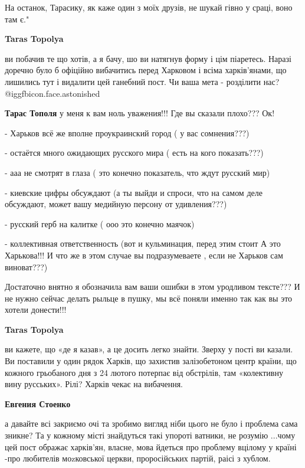 \begin{itemize}
\begin{itemize}
На останок, Тарасику, як каже один з моїх друзів, не шукай гівно у сраці, воно
там є."

\textbf{Taras Topolya} 

ви побачив те що хотів, а я бачу, шо ви натягнув форму і цім піаретесь. Наразі
доречно було б офіційно вибачитись перед Харковом і всіма харків'янами, що
лишились тут і видалити цей ганебний пост. Чи ваша мета - розділити нас?  @igg{fbicon.face.astonished} 

\textbf{Тарас Тополя} у меня к вам ноль уважения!!! Где вы сказали плохо??? Ок!

- Харьков всё же вполне проукраинский город ( у вас сомнения???)

- остаётся много ожидающих русского мира ( есть на кого показать???)

- ааа не смотрят в глаза ( это конечно показатель, что ждут русский мир)

- киевские цифры обсуждают (а ты выйди и спроси, что на самом деле обсуждают,
может вашу медийную персону от удивления???)

- русский герб на калитке ( ооо это конечно маячок)

- коллективная ответственность (вот и кульминация, перед этим стоит А это
Харькова!!! И что же в этом случае вы подразумеваете , если не Харьков сам
виноват???)

Достаточно внятно я обозначила вам ваши ошибки в этом уродливом тексте??? И не
нужно сейчас делать рыльце в пушку, мы всё поняли именно так как вы это хотели
донести!!!

\textbf{Taras Topolya} 

ви кажете, що «де я казав», а це досить легко знайти. Зверху у пості ви казали.
Ви поставили у один рядок Харків, що захистив залізобетоном центр країни, що
кожного грьобаного дня з 24 лютого потерпає від обстрілів, там «колективну вину
русських». Рілі? Харків чекає на вибачення.

\textbf{Евгения Стоенко} 

а давайте всі закриємо очі та зробимо вигляд ніби цього не було і проблема сама
зникне? Та у кожному місті знайдуться такі упороті ватники, не розумію ...чому цей
пост ображає харків'ян, власне, мова йдеться про проблему вцілому у країні -про
любителів моzковської церкви, проросійських партій, раісі з хублом.

\end{itemize} %

\end{itemize} %
